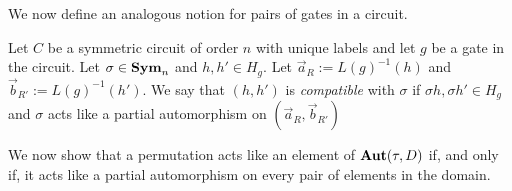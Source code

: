 \documentclass[../paper.tex]{subfiles}
\begin{document}
We now define an analogous notion for pairs of gates in a circuit.

\begin{definition}
  Let $C$ be a symmetric circuit of order $n$ with unique labels and let $g$ be
  a gate in the circuit. Let $\sigma \in \text{\textbf{Sym}}_n$ and $h, h' \in H_g$. Let
  $\vec{a}_R:= L(g)^{-1}(h)$ and $\vec{b}_{R'} := L(g)^{-1}(h')$. We say that
  $(h, h')$ is \emph{compatible} with $\sigma$ if $\sigma h, \sigma h' \in H_g$
  and $\sigma$ acts like a partial automorphism on $(\vec{a}_R, \vec{b}_{R'})$
\end{definition}
  



We now show that a permutation acts like an element of $\text{\textbf{Aut}}(\tau,D)$ if, and
only if, it acts like a partial automorphism on every pair of elements in the
domain.
\end{document}
